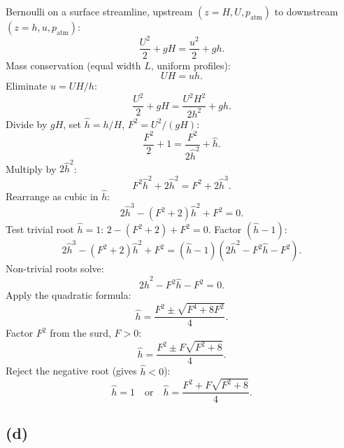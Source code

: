 \documentclass[11pt]{article}
\begin{document}
Bernoulli on a surface streamline, upstream $(z=H,U,p_{\text{atm}})$ to downstream $(z=h,u,p_{\text{atm}})$:
\[ \frac{U^{2}}{2} + gH = \frac{u^{2}}{2} + gh. \]
Mass conservation (equal width $L$, uniform profiles):
\[ UH = uh. \]
Eliminate $u = UH/h$:
\[ \frac{U^{2}}{2} + gH = \frac{U^{2}H^{2}}{2h^{2}} + gh. \]
Divide by $gH$, set $\hat h = h/H$, $F^{2}=U^{2}/(gH)$:
\[ \frac{F^{2}}{2} + 1 = \frac{F^{2}}{2\hat h^{2}} + \hat h. \]
Multiply by $2\hat h^{2}$:
\[ F^{2}\hat h^{2} + 2\hat h^{2} = F^{2} + 2\hat h^{3}. \]
Rearrange as cubic in $\hat h$:
\[ 2\hat h^{3} - (F^{2}+2)\hat h^{2} + F^{2} = 0. \]
Test trivial root $\hat h=1$: $2-(F^2+2)+F^2 = 0$. Factor $(\hat h-1)$:
\[ 2\hat h^{3} - (F^{2}+2)\hat h^{2} + F^{2} = (\hat h - 1)\!\left(2\hat h^{2} - F^{2}\hat h - F^{2}\right). \]
Non-trivial roots solve:
\[ 2\hat h^{2} - F^{2}\hat h - F^{2} = 0. \]
Apply the quadratic formula:
\[ \hat h = \frac{F^{2}\pm\sqrt{F^{4} + 8F^{2}}}{4}. \]
Factor $F^{2}$ from the surd, $F>0$:
\[ \hat h = \frac{F^{2}\pm F\sqrt{F^{2}+8}}{4}. \]
Reject the negative root (gives $\hat h<0$):
\[ \boxed{\;\hat h = 1 \quad\text{or}\quad \hat h = \frac{F^{2} + F\sqrt{F^{2}+8}}{4}.\;} \]

\subsection*{(d)}
\end{document}
